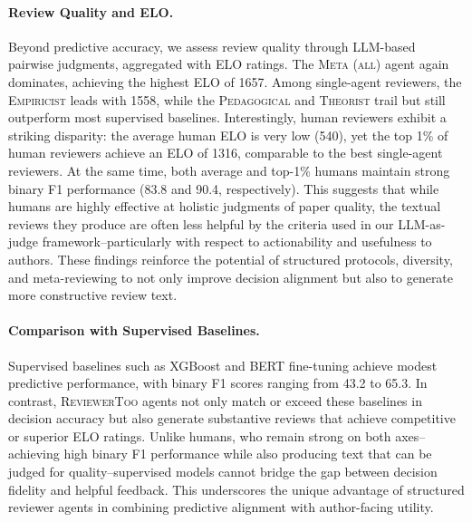 \documentclass{article} %
\newcommand{\shrink}[1][0.5]{\vspace{-#1\baselineskip}}
\begin{document}
\paragraph{Review Quality and ELO.}\shrink[0.75]
Beyond predictive accuracy, we assess review quality through LLM-based pairwise judgments, aggregated with ELO ratings. The \textsc{Meta (all)} agent again dominates, achieving the highest ELO of 1657. Among single-agent reviewers, the \textsc{Empiricist} leads with 1558, while the \textsc{Pedagogical} and \textsc{Theorist} trail but still outperform most supervised baselines. Interestingly, human reviewers exhibit a striking disparity: the average human ELO is very low (540), yet the top 1\% of human reviewers achieve an ELO of 1316, comparable to the best single-agent reviewers. At the same time, both average and top-1\% humans maintain strong binary F1 performance (83.8 and 90.4, respectively). This suggests that while humans are highly effective at holistic judgments of paper quality, the textual reviews they produce are often less helpful by the criteria used in our LLM-as-judge framework--particularly with respect to actionability and usefulness to authors. These findings reinforce the potential of structured protocols, diversity, and meta-reviewing to not only improve decision alignment but also to generate more constructive review text.

\paragraph{Comparison with Supervised Baselines.}\shrink[0.75]
Supervised baselines such as XGBoost and BERT fine-tuning achieve modest predictive performance, with binary F1 scores ranging from 43.2 to 65.3. In contrast, \textsc{ReviewerToo} agents not only match or exceed these baselines in decision accuracy but also generate substantive reviews that achieve competitive or superior ELO ratings. Unlike humans, who remain strong on both axes--achieving high binary F1 performance while also producing text that can be judged for quality--supervised models cannot bridge the gap between decision fidelity and helpful feedback. This underscores the unique advantage of structured reviewer agents in combining predictive alignment with author-facing utility.
\end{document}
